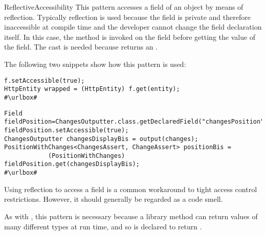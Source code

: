 \begin{pattern}{ReflectiveAccessibility}
This pattern accesses a field of an object by means of reflection.
Typically reflection is used because the field is private and therefore
inaccessible at compile time and the developer cannot change the field
declaration itself.
In this case, the method  is invoked on the field
before getting the value of the field.
The cast is needed because  returns an .

\instances{}
The following two snippets show how this pattern is used:

\def\urlvar{http://bit.ly/loopj_android_async_http_2SOISRr}
\begin{verbatim}
f.setAccessible(true);
HttpEntity wrapped = (HttpEntity) f.get(entity);
#\urlbox#
\end{verbatim}

\def\urlvar{http://bit.ly/joel_costigliola_assertj_db_2Ip1Rho}
\begin{verbatim}
Field fieldPosition=ChangesOutputter.class.getDeclaredField("changesPosition");
fieldPosition.setAccessible(true);
ChangesOutputter changesDisplayBis = output(changes);
PositionWithChanges<ChangesAssert, ChangeAssert> positionBis = 
            (PositionWithChanges) fieldPosition.get(changesDisplayBis);
#\urlbox#
\end{verbatim}


\issues{}
Using reflection to access a field is a common workaround to tight access
  control restrictions. However, it should generally be regarded as a code
  smell.

As with , this pattern is necessary because
a library method can return values of many different types at run time,
and so is declared to return .


\end{pattern}
